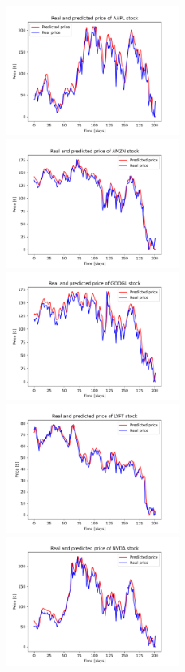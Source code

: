 \begin{figure}
\includegraphics[width=0.5\textwidth]{./graf/model6/AAPL.png}
\includegraphics[width=0.5\textwidth]{./graf/model6/AMZN.png}
\includegraphics[width=0.5\textwidth]{./graf/model6/GOOGL.png}
\includegraphics[width=0.5\textwidth]{./graf/model6/LYFT.png}
\includegraphics[width=0.5\textwidth]{./graf/model6/NVDA.png}

\end{figure}
